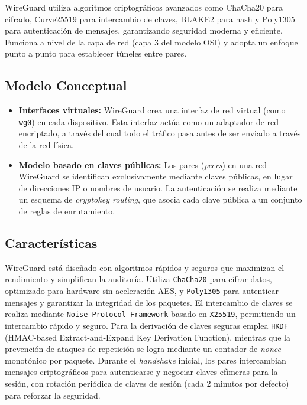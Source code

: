     WireGuard utiliza algoritmos criptográficos avanzados como ChaCha20 para cifrado, Curve25519 para intercambio de claves, BLAKE2 para hash y Poly1305 para autenticación de mensajes, garantizando seguridad moderna y eficiente. Funciona a nivel de la capa de red (capa 3 del modelo OSI) y adopta un enfoque punto a punto para establecer túneles entre pares.

   \subsection{Modelo Conceptual}
   \begin{itemize}
       \item \textbf{Interfaces virtuales:} WireGuard crea una interfaz de red virtual (como \texttt{wg0}) en cada dispositivo. Esta interfaz actúa como un adaptador de red encriptado, a través del cual todo el tráfico pasa antes de ser enviado a través de la red física.
       \item \textbf{Modelo basado en claves públicas:} Los pares (\textit{peers}) en una red WireGuard se identifican exclusivamente mediante claves públicas, en lugar de direcciones IP o nombres de usuario. La autenticación se realiza mediante un esquema de \textit{cryptokey routing}, que asocia cada clave pública a un conjunto de reglas de enrutamiento.
   \end{itemize}
   
   \subsection{Características}  
    WireGuard está diseñado con algoritmos rápidos y seguros que maximizan el rendimiento y simplifican la auditoría. Utiliza \texttt{ChaCha20} para cifrar datos, optimizado para hardware sin aceleración AES, y \texttt{Poly1305} para autenticar mensajes y garantizar la integridad de los paquetes. El intercambio de claves se realiza mediante \texttt{Noise Protocol Framework} basado en \texttt{X25519}, permitiendo un intercambio rápido y seguro. Para la derivación de claves seguras emplea \texttt{HKDF} (HMAC-based Extract-and-Expand Key Derivation Function), mientras que la prevención de ataques de repetición se logra mediante un contador de \textit{nonce} monotónico por paquete. Durante el \textit{handshake} inicial, los pares intercambian mensajes criptográficos para autenticarse y negociar claves efímeras para la sesión, con rotación periódica de claves de sesión (cada 2 minutos por defecto) para reforzar la seguridad.
   
